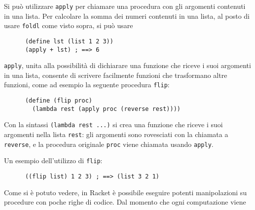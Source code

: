 Si pu\`o utilizzare \lstinline{apply} per chiamare una procedura con
gli argomenti contenuti in una lista. Per calcolare la somma dei
numeri contenuti in una lista, al posto di usare \lstinline{foldl}
come visto sopra, si pu\`o usare

\begin{lstlisting}
      (define lst (list 1 2 3))
      (apply + lst) ; ==> 6
\end{lstlisting}

\lstinline{apply}, unita alla possibilit\`a di dichiarare una funzione
che riceve i suoi argomenti in una lista, consente di scrivere
facilmente funzioni che trasformano altre funzioni, come ad esempio la
seguente procedura \lstinline{flip}:

\begin{lstlisting}
      (define (flip proc)
        (lambda rest (apply proc (reverse rest))))
\end{lstlisting}

Con la sintassi \lstinline{(lambda rest ...)} si crea una funzione che
riceve i suoi argomenti nella lista \lstinline{rest}: gli argomenti
sono rovesciati con la chiamata a \lstinline{reverse}, e la procedura
originale \lstinline{proc} viene chiamata usando \lstinline{apply}.

Un esempio dell'utilizzo di \lstinline{flip}:

\begin{lstlisting}
      ((flip list) 1 2 3) ; ==> (list 3 2 1)
\end{lstlisting}

Come si \`e potuto vedere, in Racket \`e possibile eseguire potenti
manipolazioni su procedure con poche righe di codice. Dal momento che
ogni computazione viene

